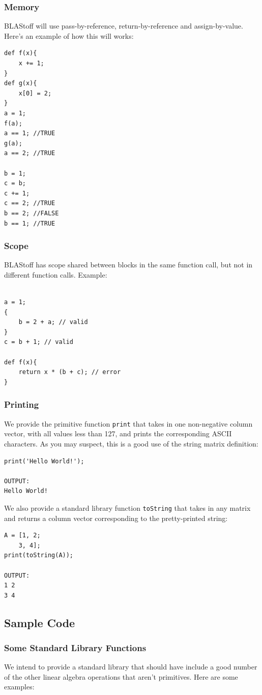 \subsubsection{Memory}
BLAStoff will use pass-by-reference, return-by-reference and assign-by-value.  Here's an example of how this will works:
\begin{lstlisting}
def f(x){
    x += 1;
}
def g(x){
    x[0] = 2;
}
a = 1;
f(a);
a == 1; //TRUE
g(a);
a == 2; //TRUE

b = 1;
c = b;
c += 1;
c == 2; //TRUE
b == 2; //FALSE
b == 1; //TRUE
\end{lstlisting}

\subsubsection{Scope}
BLAStoff has scope shared between blocks in the same function call, but not in different function calls.   Example:
\begin{lstlisting}

a = 1;
{
    b = 2 + a; // valid
}
c = b + 1; // valid

def f(x){
    return x * (b + c); // error
}
\end{lstlisting}

\subsubsection{Printing}
We provide the primitive function \verb=print= that takes in one non-negative column vector, with all values less than 127, and prints the corresponding ASCII characters.  As you may suspect, this is a good use of the string matrix definition:
\begin{lstlisting}
print('Hello World!');

OUTPUT:
Hello World!
\end{lstlisting}
We also provide a standard library function \verb=toString= that takes in any matrix and returns a column vector corresponding to the pretty-printed string:
\begin{lstlisting}
A = [1, 2;
    3, 4];
print(toString(A));

OUTPUT:
1 2
3 4
\end{lstlisting}

\subsection{Sample Code}

\subsubsection{Some Standard Library Functions}
We intend to provide a standard library that should have include a good number of the other linear algebra operations that aren't primitives.  Here are some examples:

